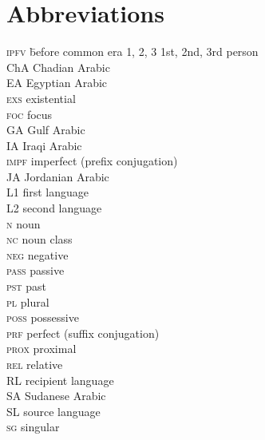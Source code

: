 \documentclass[output=paper]{langsci/langscibook}
\begin{document}
\section*{Abbreviations}
\setlength{\columnsep}{30pt}
\begin{multicols}{2}
\begin{tabbing}
\textsc{ipfv} \hspace{1em} \= before common era\kill
\textsc{1, 2, 3} \> 1st, 2nd, 3rd person \\
ChA \> Chadian Arabic \\
EA \> Egyptian Arabic \\
\textsc{exs} \> existential \\
\textsc{foc} \> focus \\
GA \> Gulf Arabic \\
IA \> Iraqi Arabic \\
\textsc{impf} \> imperfect (prefix conjugation) \\
JA \> Jordanian Arabic \\
L1 \> first language\\
L2 \> second language\\
\textsc{n} \> noun \\
\textsc{nc} \> noun class \\
\textsc{neg} \> negative \\
\textsc{pass} \> passive \\
\textsc{pst} \> past \\
\textsc{pl} \> plural \\
\textsc{poss} \> possessive \\
\textsc{prf} \> perfect (suffix conjugation) \\
\textsc{prox} \> proximal \\
\textsc{rel} \> relative \\
RL \> recipient language \\
SA \> Sudanese Arabic \\
SL \> source language \\
\textsc{sg} \> singular
\end{tabbing}
\end{multicols}


\sloppy\printbibliography[heading=subbibliography,notkeyword=this]
\end{document}
